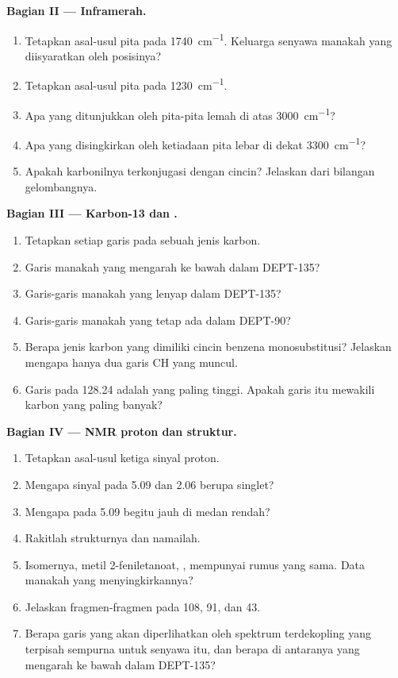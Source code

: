 \begin{problem}
\medskip
\noindent\textbf{Bagian II --- Inframerah.}
\begin{enumerate}[resume]
  \item Tetapkan asal-usul pita pada \qty{1740}{cm^{-1}}. Keluarga senyawa
        manakah yang diisyaratkan oleh posisinya?
  \item Tetapkan asal-usul pita pada \qty{1230}{cm^{-1}}.
  \item Apa yang ditunjukkan oleh pita-pita lemah di atas \qty{3000}{cm^{-1}}?
  \item Apa yang disingkirkan oleh ketiadaan pita lebar di dekat \qty{3300}{cm^{-1}}?
  \item Apakah karbonilnya terkonjugasi dengan cincin? Jelaskan dari bilangan gelombangnya.
\end{enumerate}

\medskip
\noindent\textbf{Bagian III --- Karbon-13 dan .}
\begin{enumerate}[resume]
  \item Tetapkan setiap garis pada sebuah jenis karbon.
  \item Garis manakah yang mengarah ke bawah dalam DEPT-135?
  \item Garis-garis manakah yang lenyap dalam DEPT-135?
  \item Garis-garis manakah yang tetap ada dalam DEPT-90?
  \item Berapa jenis karbon yang dimiliki cincin benzena monosubstitusi?
        Jelaskan mengapa hanya dua garis CH  yang muncul.
  \item Garis pada 128.24 adalah yang paling tinggi. Apakah garis itu
        mewakili karbon yang paling banyak?
\end{enumerate}

\medskip
\noindent\textbf{Bagian IV --- NMR proton dan struktur.}
\begin{enumerate}[resume]
  \item Tetapkan asal-usul ketiga sinyal proton.
  \item Mengapa sinyal pada 5.09 dan 2.06 berupa singlet?
  \item Mengapa  pada 5.09 begitu jauh di medan rendah?
  \item Rakitlah strukturnya dan namailah.
  \item Isomernya, metil 2-feniletanoat, , mempunyai rumus
        yang sama. Data manakah yang menyingkirkannya?
  \item Jelaskan fragmen-fragmen pada 108, 91, dan 43.
  \item Berapa garis yang akan diperlihatkan oleh spektrum 
        terdekopling yang terpisah sempurna untuk senyawa itu, dan berapa
        di antaranya yang mengarah ke bawah dalam DEPT-135?
\end{enumerate}
\end{problem}
